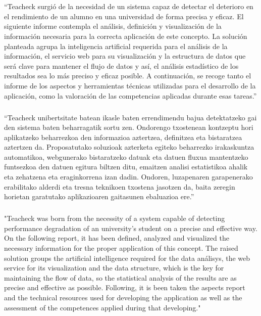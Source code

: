 \chapter*{\abstract}

\setcounter{page}{}

\paragraph{}
“Teacheck surgió de la necesidad de un sistema capaz de detectar el deterioro en el rendimiento de un alumno en una universidad de forma precisa y eficaz. El siguiente informe  contempla el análisis, definición y visualización de la información necesaria para la correcta aplicación de este concepto. La solución planteada agrupa la inteligencia artificial requerida para el análisis de la información, el servicio web para su visualización y la estructura de datos que será clave para mantener el flujo de datos y así, el análisis estadístico de los resultados sea lo más preciso y eficaz posible. A continuación, se recoge tanto el informe de los aspectos y herramientas técnicas utilizadas para el desarrollo de la aplicación, como la valoración de las competencias aplicadas durante esas tareas.”

\paragraph{}
“Teacheck unibertsitate batean ikasle baten errendimendu bajua detektatzeko gai den sistema baten beharragatik sortu zen. Ondorengo txostenean kontzeptu hori aplikatzeko beharrezkoa den informazioa aztertzea, definitzea eta bistaratzea aztertzen da. Proposatutako soluzioak azterketa egiteko beharrezko irakaskuntza automatikoa, webgunerako bistaratzeko datuak eta datuen fluxua mantentzeko funtsezkoa den datuen egitura biltzen ditu, emaitzen analisi estatistikoa ahalik eta zehatzena eta eraginkorrena izan dadin. Ondoren, luzapenaren garapenerako erabilitako alderdi eta tresna teknikoen txostena jasotzen da, baita zeregin horietan garatutako aplikazioaren gaitasunen ebaluazioa ere.”

\paragraph{}
"Teacheck was born from the necessity of a system capable of detecting performance degradation of an university’s student on a precise and effective way. On the following report, it has been defined, analyzed and visualized the necessary information for the proper application of this concept. The raised solution groups the artificial intelligence required for the data análisys, the web service for its visualization and the data structure, which is the key for maintaining the flow of data, so the statistical analysis of the results  are as precise and effective as possible. Following, it is been taken the aspects report and the technical resources used for developing the application as well as the assessment of the competences applied during that developing."
